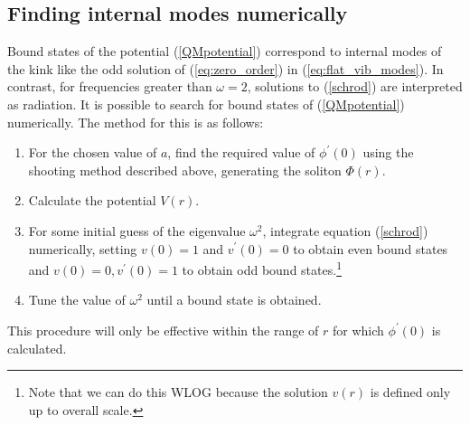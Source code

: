 
\subsection{Finding internal modes numerically}
\label{sec:finding_bound_states_numerically}
Bound states of the potential (\ref{QMpotential}) correspond to internal modes of the kink like the odd solution of (\ref{eq:zero_order}) in (\ref{eq:flat_vib_modes}). In contrast, for frequencies greater than $\omega = 2$, solutions to (\ref{schrod}) are interpreted as radiation. It is possible to search for bound states of (\ref{QMpotential}) numerically. The method for this is as follows:
\begin{enumerate}
\item For the chosen value of $a$, find the required value of $\phi^\prime(0)$ using the shooting method described above, generating the soliton $\Phi(r)$.
\item Calculate the potential $V(r)$.
\item For some initial guess of the eigenvalue $\omega^2$, integrate equation ({\ref{schrod}}) numerically, setting $v(0)=1$ and $v^\prime (0)=0$ to obtain even bound states and $v(0)=0,v^\prime(0)=1$ to obtain odd bound states.\footnote{Note that we can do this WLOG because the solution $v(r)$ is defined only up to overall scale.}
\item Tune the value of $\omega^2$ until a bound state is obtained.
\end{enumerate}
This procedure will only be effective within the range of $r$ for which $\phi^\prime(0)$ is calculated.


